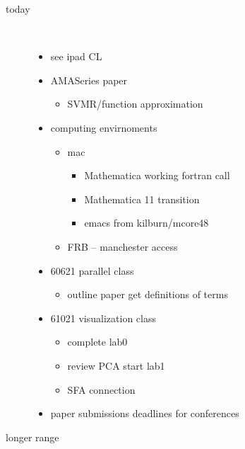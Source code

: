 \documentclass[hyperref]{labbook}
\begin{document}
\begin{description}
\item[today] \ 

\begin{itemize}
\item see ipad CL
\item AMASeries paper
  \begin{itemize}
  \item SVMR/function approximation
  \end{itemize}
\item computing envirnoments
  \begin{itemize}
  \item mac
    \begin{itemize}
    \item     Mathematica working fortran call
  \item Mathematica 11 transition
  \item emacs from kilburn/mcore48
    \end{itemize}
  \item FRB -- manchester access
  \end{itemize}

\item 60621 parallel class
  \begin{itemize}
  \item outline paper get definitions of terms
  \end{itemize}

\item 61021 visualization class
  \begin{itemize}
  \item complete lab0
  \item review PCA start lab1
  \item SFA connection
  \end{itemize}
\item paper submissions deadlines for conferences
\end{itemize}

\item[longer range] \ 


\end{description}
\end{document}
